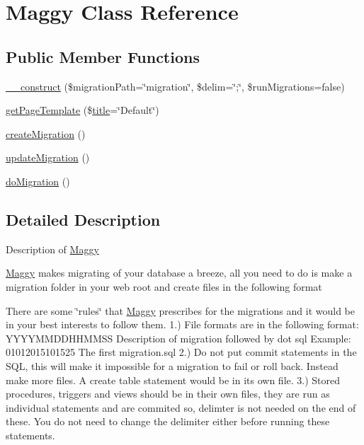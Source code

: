 \hypertarget{classMaggy}{}\section{Maggy Class Reference}
\label{classMaggy}
\subsection*{Public Member Functions}
\begin{DoxyCompactItemize}
\item 
\hyperlink{classMaggy_a067cf2f5b502b1ff73d63e1a2b927545}{\+\_\+\+\_\+construct} (\$migration\+Path=\char`\"{}migration\char`\"{}, \$delim=\char`\"{};\char`\"{}, \$run\+Migrations=false)
\item 
\hyperlink{classMaggy_a494c35bf7f6d5a704e430d20da195954}{get\+Page\+Template} (\$\hyperlink{Shape_8php_ad264ad0cabbe965bf7f7c8a5ed6abebb}{title}=\char`\"{}Default\char`\"{})
\item 
\hyperlink{classMaggy_a2b4d618fa3afc138f4b1cab39adc371c}{create\+Migration} ()
\item 
\hyperlink{classMaggy_afd787d71f29b356d6a6de0d0707b6be4}{update\+Migration} ()
\item 
\hyperlink{classMaggy_a4c8fb8426aeb2aaed4968fbb207d19c2}{do\+Migration} ()
\end{DoxyCompactItemize}


\subsection{Detailed Description}
Description of \hyperlink{classMaggy}{Maggy}

\hyperlink{classMaggy}{Maggy} makes migrating of your database a breeze, all you need to do is make a migration folder in your web root and create files in the following format

There are some \char`\"{}rules\char`\"{} that \hyperlink{classMaggy}{Maggy} prescribes for the migrations and it would be in your best interests to follow them. 1.) File formats are in the following format\+: Y\+Y\+Y\+Y\+M\+M\+D\+D\+H\+H\+M\+M\+S\+S Description of migration followed by dot sql Example\+: 01012015101525 The first migration.\+sql 2.) Do not put commit statements in the S\+Q\+L, this will make it impossible for a migration to fail or roll back. Instead make more files. A create table statement would be in its own file. 3.) Stored procedures, triggers and views should be in their own files, they are run as individual statements and are commited so, delimter is not needed on the end of these. You do not need to change the delimiter either before running these statements.


